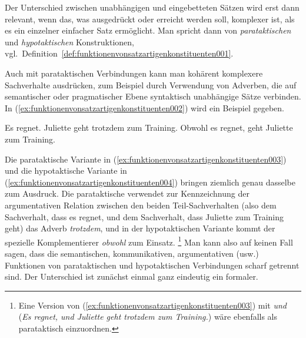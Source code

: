 Der Unterschied zwischen unabhängigen und eingebetteten Sätzen wird erst dann relevant, wenn das, was ausgedrückt oder erreicht werden soll, komplexer ist, als es ein einzelner einfacher Satz ermöglicht.
Man spricht dann von \textit{parataktischen} und \textit{hypotaktischen} Konstruktionen, vgl.\ Definition~\ref{def:funktionenvonsatzartigenkonstituenten001}.


Auch mit parataktischen Verbindungen kann man kohärent komplexere Sachverhalte ausdrücken, zum Beispiel durch Verwendung von Adverben, die auf semantischer oder pragmatischer Ebene syntaktisch unabhängige Sätze verbinden.
In (\ref{ex:funktionenvonsatzartigenkonstituenten002}) wird ein Beispiel gegeben.

\begin{exe}
  \ex\label{ex:funktionenvonsatzartigenkonstituenten002} 
  \begin{xlist}
    \ex\label{ex:funktionenvonsatzartigenkonstituenten003} Es regnet. Juliette geht trotzdem zum Training.
    \ex\label{ex:funktionenvonsatzartigenkonstituenten004} Obwohl es regnet, geht Juliette zum Training.
  \end{xlist}
\end{exe}

Die parataktische Variante in (\ref{ex:funktionenvonsatzartigenkonstituenten003}) und die hypotaktische Variante in (\ref{ex:funktionenvonsatzartigenkonstituenten004}) bringen ziemlich genau dasselbe zum Ausdruck.
Die parataktische verwendet zur Kennzeichnung der argumentativen Relation zwischen den beiden Teil-Sachverhalten (also dem Sachverhalt, dass es regnet, und dem Sachverhalt, dass Juliette zum Training geht) das Adverb \textit{trotzdem}, und in der hypotaktischen Variante kommt der spezielle Komplementierer \textit{obwohl} zum Einsatz.%
\footnote{Eine Version von (\ref{ex:funktionenvonsatzartigenkonstituenten003}) mit \textit{und} (\textit{Es regnet, und Juliette geht trotzdem zum Training.}) wäre ebenfalls als parataktisch einzuordnen.}
Man kann also auf keinen Fall sagen, dass die semantischen, kommunikativen, argumentativen (usw.) Funktionen von parataktischen und hypotaktischen Verbindungen scharf getrennt sind.
Der Unterschied ist zunächst einmal ganz eindeutig ein formaler.


